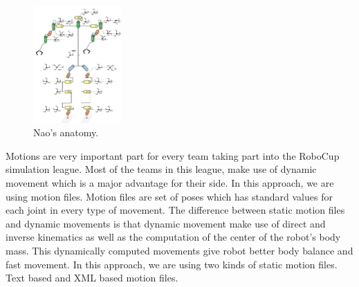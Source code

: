 \begin{figure}[t!]
\centering
  \includegraphics[width=0.3\textwidth]{Chapter3/figures/Models_NaoAnatomy.png}
  \caption{Nao's anatomy.}
  \label{fig:NaoAnatomy}
\end{figure}



Motions are very important part for every team taking part into the RoboCup simulation league. Most of the teams in this league, make use of dynamic movement which is a major advantage for their side. In this approach, we are using motion files. Motion files are set of poses which has standard values for each joint in every type of movement. The difference between static motion files and dynamic movements is that dynamic movement make use of direct and inverse kinematics as well as the computation of the center of the robot's body mass. This dynamically computed movements give robot better body balance and fast movement. In this approach, we are using two kinds of static motion files. Text based and XML based motion files.


